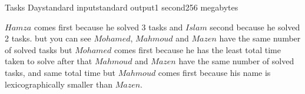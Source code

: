 \begin{problem}{Tasks Day}{standard input}{standard output}{1 second}{256 megabytes}
\Example

\begin{example}
%
\end{example}

\Note
$Hamza$ comes first because he solved 3 tasks and $Islam$ second because he solved 2 tasks. but you can see $Mohamed$, $Mahmoud$ and $Mazen$ have the same number of solved tasks but $Mohamed$ comes first because he has the least total time taken to solve after that $Mahmoud$ and $Mazen$ have the same number of solved tasks, and same total time but $Mahmoud$ comes first because his name is lexicographically smaller than $Mazen$. 

\end{problem}


